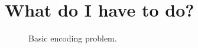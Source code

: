 \begin{comment}
The OF~\cite{horn1981determining} tries to establish connections between the pixels of
the frames $P$ and $R$ supposing that:
\begin{enumerate}
\item $P$ and $R$ are adjacent in time (if $R$ was taken at time $t$,
  $P$ is taken at time $dt+t$) and therefore, similar in
  content.
\item Similarity between images implies that the pixels in both
  frames, $R$ and $P$, will have the same luminance. If $I(x,y,t)$
  measures the luminance of the pixel $(x,y)$ of the frame $R$,
  similarity can be modeled by
  \begin{equation}
    I(x+dx, y+dy, t+dt) = I(x,y,t),
    \label{eq:similarity}
  \end{equation}
  where $I(x+dx, y+dy, t+dt)$ is the corresponding pixel in the frame
  $P$. The first part of the Eq.~\ref{eq:similarity} can be also
  computed by (using the first-order Taylor expansion) as
  \begin{equation}
    I(x+dx, y+dy, t+dt) = I(x,y,t) + \frac{\partial I}{\partial x}dx + \frac{\partial I}{\partial y}dy + \frac{\partial I}{\partial t}dt,
    \label{eq:taylor_exp}
  \end{equation}
  andtherefore, it must be true that
  \begin{equation}
    \frac{\partial I}{\partial x}dx + \frac{\partial I}{\partial y}dy + \frac{\partial I}{\partial t}dt = 0.
    \label{eq:constraint}
  \end{equation}
  Dividing by $dt$, we finally get that
  \begin{equation}
    \frac{\partial I}{\partial x}\frac{dx}{dt} + \frac{\partial I}{\partial y}\frac{dy}{dt} + \frac{\partial I}{\partial t} = 0.
  \end{equation}
\item Adjacent pixels follow parallel
  trajectories~\cite{horn1981determining}, with basically means that
  neighbor pixels will have similar motion.
\end{enumerate}
\end{comment}

\section{What do I have to do?}

\begin{figure}
  \centering
  \caption{Basic encoding problem.}
  \label{fig:problem}
\end{figure}

